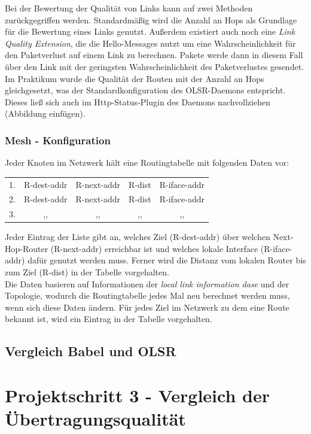\documentclass[10pt]{scrartcl}
\begin{document}
Bei der Bewertung der Qualität von Links kann auf zwei Methoden zurückgegriffen werden.
Standardmäßig wird die Anzahl an Hops als Grundlage für die Bewertung eines Links genutzt.
Außerdem existiert auch noch eine \textit{Link Quality Extension}, die die Hello-Messages nutzt um eine Wahrscheinlichkeit für den Paketverlust auf einem Link zu berechnen.
Pakete werde dann in diesem Fall über den Link mit der geringsten Wahrscheinlichkeit des Paketverlustes gesendet.\\
Im Praktikum wurde die Qualität der Routen mit der Anzahl an Hops gleichgesetzt, was der Standardkonfiguration des OLSR-Daemons entspricht.
Dieses ließ sich auch im Http-Status-Plugin des Daemons nachvollziehen (Abbildung einfügen).


\subsubsection{Mesh - Konfiguration}
Jeder Knoten im Netzwerk hält eine Routingtabelle mit folgenden Daten vor:

\begin{tabular}{l c c c c}
1. & R-dest-addr & R-next-addr & R-dist & R-iface-addr \\
2. &  R-dest-addr & R-next-addr & R-dist & R-iface-addr \\
3. & ,, & ,, & ,, & ,, \\
\end{tabular}

Jeder Eintrag der Liste gibt an, welches Ziel (R-dest-addr) über welchen Next-Hop-Router (R-next-addr) erreichbar ist und welches lokale Interface (R-iface-addr) dafür genutzt werden muss. Ferner wird die Distanz vom lokalen Router bis zum Ziel (R-dist) in der Tabelle vorgehalten.\\
Die Daten basieren auf Informationen der \textit{local link information dase} und der Topologie, wodurch die Routingtabelle jedes Mal neu berechnet werden muss, wenn sich diese Daten ändern. Für jedes Ziel im Netzwerk zu dem eine Route bekannt ist, wird ein Eintrag in der Tabelle vorgehalten.


\subsection{Vergleich Babel und OLSR}


\section{Projektschritt 3 - Vergleich der Übertragungsqualität}
\end{document}
